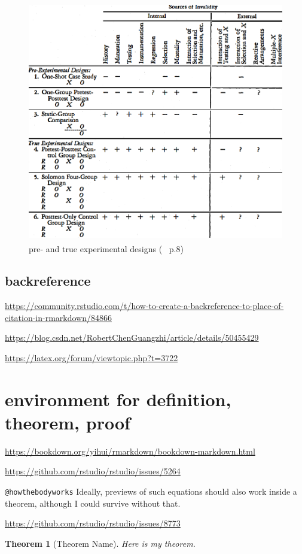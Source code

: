 \documentclass[
]{book}
\newtheorem{theorem}{Theorem}[chapter]
\theoremstyle{definition}
\theoremstyle{definition}
\theoremstyle{definition}
\theoremstyle{definition}
\theoremstyle{remark}
\begin{document}
\begin{figure}
\includegraphics[width=0.65\linewidth]{img/pre-and-true-experimental-designs} \caption{pre- and true experimental designs (~\textsuperscript{} p.8)}\label{fig:unnamed-chunk-52}
\end{figure}

\subsection{backreference}\label{backreference}

\url{https://community.rstudio.com/t/how-to-create-a-backreference-to-place-of-citation-in-rmarkdown/84866}

\url{https://blog.csdn.net/RobertChenGuangzhi/article/details/50455429}

\url{https://latex.org/forum/viewtopic.php?t=3722}

\section{environment for definition, theorem, proof}\label{environment-for-definition-theorem-proof}

\url{https://bookdown.org/yihui/rmarkdown/bookdown-markdown.html}

\url{https://github.com/rstudio/rstudio/issues/5264}

\texttt{@howthebodyworks} Ideally, previews of such equations should also work inside a theorem, although I could survive without that.

\url{https://github.com/rstudio/rstudio/issues/8773}

\begin{theorem}[Theorem Name]
\protect\hypertarget{thm:label}{}\label{thm:label}Here is my theorem.
\end{theorem}
\end{document}
